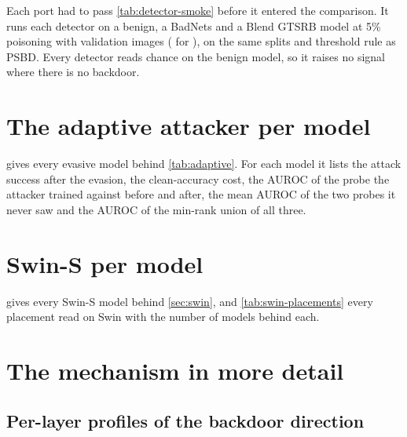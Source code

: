Each port had to pass \cref{tab:detector-smoke} before it entered the comparison. It runs each detector on a benign, a BadNets and a Blend GTSRB model at 5\% poisoning with \SmokeValidationImages{} validation images (\SmokeValidationImagesExceptionSize{} for \SmokeValidationImagesExceptions{}), on the same splits and threshold rule as PSBD. Every detector reads chance on the benign model, so it raises no signal where there is no backdoor.


\FloatBarrier
\clearpage


\section{The adaptive attacker per model}
\label{app:adaptive-per-model}

 gives every evasive model behind \cref{tab:adaptive}. For each model it lists the attack success after the evasion, the clean-accuracy cost, the AUROC of the probe the attacker trained against before and after, the mean AUROC of the two probes it never saw and the AUROC of the min-rank union of all three.


\FloatBarrier
\clearpage


\section{Swin-S per model}
\label{supp:swin}

 gives every Swin-S model behind \cref{sec:swin}, and \cref{tab:swin-placements} every placement read on Swin with the number of models behind each.


\FloatBarrier

\FloatBarrier
\clearpage


\section{The mechanism in more detail}
\label{supp:mechanism}

\subsection{Per-layer profiles of the backdoor direction}
\label{app:layers}


